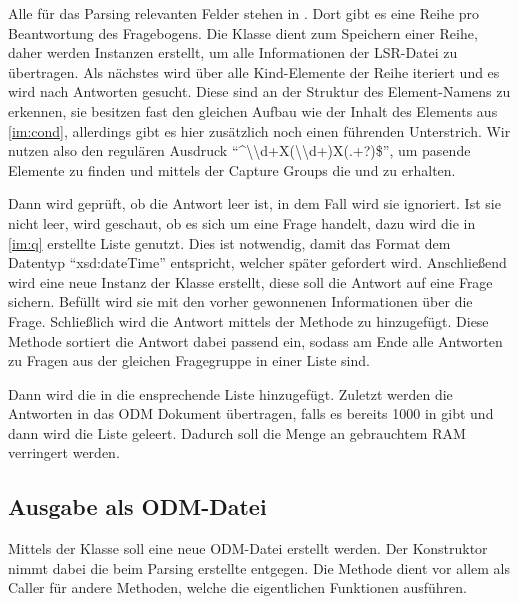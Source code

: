 Alle für das Parsing relevanten Felder stehen in . Dort gibt es eine Reihe pro Beantwortung des Fragebogens.
Die Klasse  dient zum Speichern einer Reihe, daher werden Instanzen erstellt, um alle Informationen der LSR-Datei zu übertragen.
Als nächstes wird über alle Kind-Elemente der Reihe iteriert und es wird nach Antworten gesucht.
Diese sind an der Struktur des Element-Namens zu erkennen, sie besitzen fast den gleichen Aufbau wie der Inhalt des Elements  aus \cref{im:cond}, allerdings gibt es hier zusätzlich noch einen führenden Unterstrich.
Wir nutzen also den regulären Ausdruck \enquote{\textasciicircum\textunderscore\textbackslash\textbackslash d+X(\textbackslash\textbackslash d+)X(.+?)\$}, um pasende Elemente zu finden und mittels der Capture Groups die  und  zu erhalten.

Dann wird geprüft, ob die Antwort leer ist, in dem Fall wird sie ignoriert.
Ist sie nicht leer, wird geschaut, ob es sich um eine  Frage handelt, dazu wird die in \cref{im:q} erstellte Liste genutzt. Dies ist notwendig, damit das Format dem Datentyp \enquote{xsd:dateTime} entspricht, welcher später gefordert wird.
Anschließend wird eine neue Instanz der Klasse  erstellt, diese soll die Antwort auf eine Frage sichern.
Befüllt wird sie mit den vorher gewonnenen Informationen über die Frage.
Schließlich wird die Antwort mittels der Methode  zu  hinzugefügt.
Diese Methode sortiert die Antwort dabei passend ein, sodass am Ende alle Antworten zu Fragen aus der gleichen Fragegruppe in einer Liste sind.

Dann wird die  in die ensprechende Liste hinzugefügt.
Zuletzt werden die Antworten in das ODM Dokument übertragen, falls es bereits 1000 in  gibt und dann wird die Liste geleert.
Dadurch soll die Menge an gebrauchtem RAM verringert werden.

\subsection{Ausgabe als ODM-Datei}

Mittels der Klasse  soll eine neue ODM-Datei erstellt werden. Der Konstruktor nimmt dabei die beim Parsing erstellte  entgegen.
Die Methode  dient vor allem als Caller für andere Methoden, welche die eigentlichen Funktionen ausführen.

